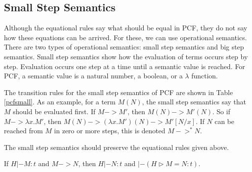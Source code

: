 \subsection{Small Step Semantics}

Although the equational rules say what should be equal in PCF, they do not say how these equations can be arrived.  For these, we can use operational semantics.  There are two types of operational semantics:  small step semantics and big step semantics.  Small step semantics show how the evaluation of terms occurs step by step.  Evaluation occurs one step at a time until a semantic value is reached.  For PCF, a semantic value is a natural number, a boolean, or a $\lambda$ function.

The transition rules for the small step semantics of PCF are shown in Table \ref{pcfsmall}.  As an example, for a term $M(N)$, the small step semantics say that $M$ should be evaluated first.  If $M->M'$, then $M(N) -> M'(N)$.  So if $M-> \lambda x.M'$, then $M(N) -> (\lambda x.M')(N) -> M'[N/x]$.  If $N$ can be reached from $M$ in zero or more steps, this is denoted $M ->^{*} N$.

\begin{table}
\begin{center}
\caption{Small Step Semantics For PCF} \label{pcfsmall}
\end{center}
\end{table}
The small step semantics should preserve the equational rules given above.
\begin{theorem}
If $H|-M:t$ and $M->N$, then $H|-N:t$ and $|-(H\triangleright M=N:t)$.
\end{theorem}


